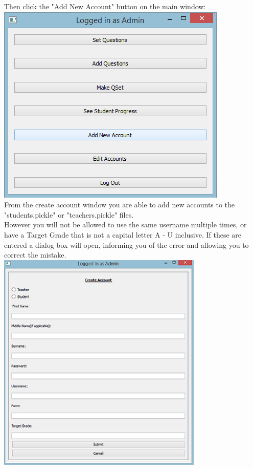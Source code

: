 \documentclass{report}
\begin{document}
\bigskip
Then click the "Add New Account" button on the main window:\\
\bigskip
\includegraphics{adminmain}\\
\clearpage
From the create account window you are able to add new accounts to the "students.pickle" or "teachers.pickle" files.\\
However you will not be allowed to use the same username multiple times, or have a Target Grade that is not a capital letter A - U inclusive. If these are entered a dialog box will open, informing you of the error and allowing you to correct the mistake.\\
\includegraphics{addaccount}\\
\end{document}
